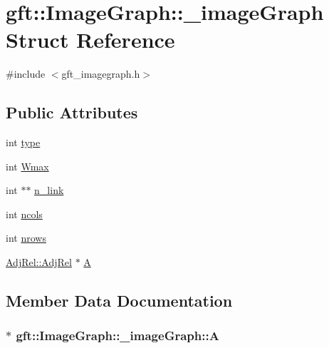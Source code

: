 \hypertarget{structgft_1_1ImageGraph_1_1__imageGraph}{}\section{gft\+:\+:Image\+Graph\+:\+:\+\_\+image\+Graph Struct Reference}
\label{structgft_1_1ImageGraph_1_1__imageGraph}


{\ttfamily \#include $<$gft\+\_\+imagegraph.\+h$>$}

\subsection*{Public Attributes}
\begin{DoxyCompactItemize}
\item 
int \hyperlink{structgft_1_1ImageGraph_1_1__imageGraph_ac135b8005c5f1681b614ec07e29acf26}{type}
\item 
int \hyperlink{structgft_1_1ImageGraph_1_1__imageGraph_a8773568670a4fc2c373775370bae17e7}{Wmax}
\item 
int $\ast$$\ast$ \hyperlink{structgft_1_1ImageGraph_1_1__imageGraph_a8f4688b66d07a3aa3c0aaa18a418f665}{n\+\_\+link}
\item 
int \hyperlink{structgft_1_1ImageGraph_1_1__imageGraph_aa4a2e833922849f32dfc944bc56b553a}{ncols}
\item 
int \hyperlink{structgft_1_1ImageGraph_1_1__imageGraph_ad6182a4c1f37e54e83f92fdcb7094241}{nrows}
\item 
\hyperlink{namespacegft_1_1AdjRel_a832ff5521af7a9801ff18dc3ae629b68}{Adj\+Rel\+::\+Adj\+Rel} $\ast$ \hyperlink{structgft_1_1ImageGraph_1_1__imageGraph_ae901aeb67634e815929d074741939d64}{A}
\end{DoxyCompactItemize}


\subsection{Member Data Documentation}
\subsubsection[{\texorpdfstring{A}{A}}]{$\ast$ gft\+::\+Image\+Graph\+::\+\_\+image\+Graph\+::A}\hypertarget{structgft_1_1ImageGraph_1_1__imageGraph_ae901aeb67634e815929d074741939d64}{}\label{structgft_1_1ImageGraph_1_1__imageGraph_ae901aeb67634e815929d074741939d64}

